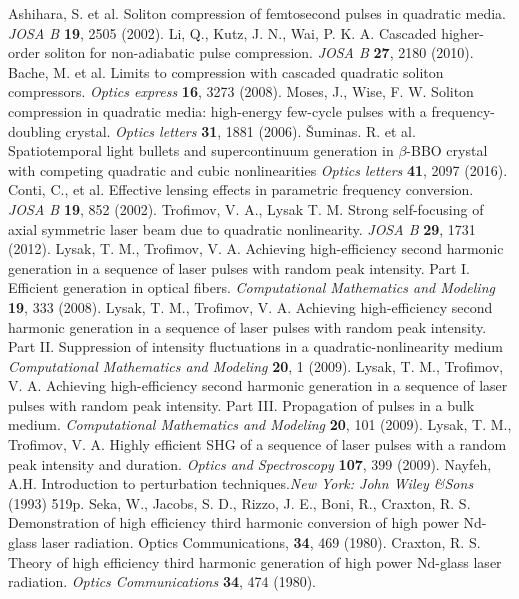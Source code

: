 \documentclass[a4paper, 12pt, onecolumn]{extarticle}
\begin{document}
\begin{thebibliography}{0}
 Ashihara, S. et al. Soliton compression of femtosecond pulses in quadratic media. \textit{JOSA B} \textbf{19}, 2505 (2002).
 Li, Q., Kutz, J. N., Wai, P. K. A. Cascaded higher-order soliton for non-adiabatic pulse compression. \textit{JOSA B} \textbf{27}, 2180 (2010).
 Bache, M. et al. Limits to compression with cascaded quadratic soliton compressors. \textit{Optics express} \textbf{16}, 3273 (2008).
 Moses, J., Wise, F. W. Soliton compression in quadratic media: high-energy few-cycle pulses with a frequency-doubling crystal. \textit{Optics letters} \textbf{31}, 1881 (2006).
 \v{S}uminas. R. et al. Spatiotemporal light bullets and supercontinuum generation in $\beta$-BBO crystal with competing quadratic and cubic nonlinearities \textit{Optics letters} \textbf{41}, 2097 (2016).
 Conti, C., et al. Effective lensing effects in parametric frequency conversion. \textit{JOSA B} \textbf{19},  852 (2002).
 Trofimov, V. A., Lysak T. M. Strong self-focusing of axial symmetric laser beam due to quadratic nonlinearity. \textit{JOSA B} \textbf{29}, 1731 (2012).
 Lysak, T. M., Trofimov, V. A. Achieving high-efficiency second harmonic generation in a sequence of laser pulses with random peak intensity. Part I. Efficient generation in optical fibers. \textit{Computational Mathematics and Modeling} \textbf{19}, 333 (2008).
 Lysak, T. M., Trofimov, V. A. Achieving high-efficiency second harmonic generation in a sequence of laser pulses with random peak intensity. Part II. Suppression of intensity fluctuations in a quadratic-nonlinearity medium \textit{Computational Mathematics and Modeling} \textbf{20}, 1 (2009).
 Lysak, T. M., Trofimov, V. A. Achieving high-efficiency second harmonic generation in a sequence of laser pulses with random peak intensity. Part III. Propagation of pulses in a bulk medium. \textit{Computational Mathematics and Modeling} \textbf{20}, 101 (2009).
 Lysak, T. M., Trofimov, V. A. Highly efficient SHG of a sequence of laser pulses with a random peak intensity and duration. \textit{Optics and Spectroscopy} \textbf{107}, 399 (2009).
 Nayfeh, A.H. Introduction to perturbation techniques.\textit{New York: John Wiley \&Sons} (1993) 519p.
 Seka, W., Jacobs, S. D., Rizzo, J. E., Boni, R., Craxton, R. S. Demonstration of high efficiency third harmonic conversion of high power Nd-glass laser radiation. Optics Communications, \textbf{34}, 469 (1980).
 Craxton, R. S. Theory of high efficiency third harmonic generation of high power Nd-glass laser radiation. \textit{Optics Communications} \textbf{34}, 474 (1980).


\end{thebibliography}
\end{document}
